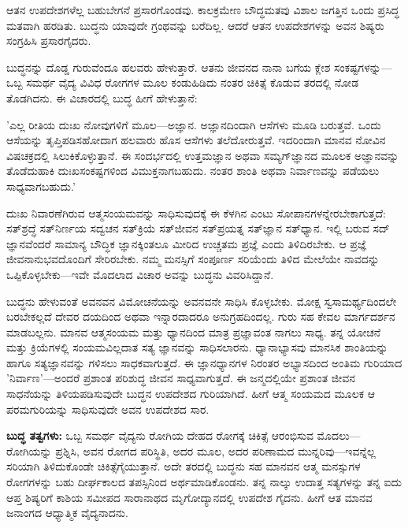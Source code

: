 ಆತನ ಉಪದೇಶಗಳೆಲ್ಲ ಬಹುಬೇಗನೆ ಪ್ರಸಾರಗೊಂಡವು. ಕಾಲಕ್ರಮೇಣ ಬೌದ್ಧಮತವು ವಿಶಾಲ ಜಗತ್ತಿನ ಒಂದು ಪ್ರಸಿದ್ಧ ಮತವಾಗಿ ಹರಡಿತು. ಬುದ್ಧನು ಯಾವುದೇ ಗ್ರಂಥವನ್ನು ಬರೆದಿಲ್ಲ. ಆದರೆ ಆತನ ಉಪದೇಶಗಳನ್ನು ಅವನ ಶಿಷ್ಯರು ಸಂಗ್ರಹಿಸಿ ಪ್ರಸಾರಗೈದರು.

ಬುದ್ಧನನ್ನು ದೊಡ್ಡ ಗುರುವೆಂದೂ ಹಲವರು ಹೇಳುತ್ತಾರೆ. ಆತನು ಜೀವನದ ನಾನಾ ಬಗೆಯ ಕ್ಲೇಶ ಸಂಕಷ್ಟಗಳನ್ನು—ಒಬ್ಬ ಸಮರ್ಥ ವೈದ್ಯ ವಿವಿಧ ರೋಗಗಳ ಮೂಲ ಕಂಡುಹಿಡಿದು ನಂತರ ಚಿಕಿತ್ಸೆ ಕೊಡುವ ತರದಲ್ಲಿ ನೋಡ ತೊಡಗಿದನು. ಈ ವಿಚಾರದಲ್ಲಿ ಬುದ್ಧ ಹೀಗೆ ಹೇಳುತ್ತಾನೆ:

'ಎಲ್ಲ ರೀತಿಯ ದುಃಖ ನೋವುಗಳಿಗೆ ಮೂಲ—ಅಜ್ಞಾನ. ಅಜ್ಞಾನದಿಂದಾಗಿ ಆಸೆಗಳು ಮೂಡಿ ಬರುತ್ತವೆ. ಒಂದು ಆಸೆಯನ್ನು ತೃಪ್ತಿಪಡಿಸಹೋದಾಗ ಹಲವಾರು ಹೊಸ ಆಸೆಗಳು ತಲೆದೋರುತ್ತವೆ. ಇದರಿಂದಾಗಿ ಮಾನವ ನೋವಿನ ವಿಷಚಕ್ರದಲ್ಲಿ ಸಿಲುಕಿಕೊಳ್ಳುತ್ತಾನೆ. ಈ ಸಂದರ್ಭದಲ್ಲಿ ಉತ್ತಮಜ್ಞಾನ ಅಥವಾ ಸಮ್ಯಗ್​ಜ್ಞಾನದ ಮೂಲಕ ಅಜ್ಞಾನವನ್ನು ತೊಡೆದುಹಾಕಿ ದುಃಖಸಂಕಷ್ಟಗಳಿಂದ ವಿಮುಕ್ತನಾಗಬಹುದು. ನಂತರ ಶಾಂತಿ ಅಥವಾ ನಿರ್ವಾಣವನ್ನು ಪಡೆಯಲು ಸಾಧ್ಯವಾಗಬಹುದು.'

ದುಃಖ ನಿವಾರಣೆಗಿರುವ ಆತ್ಮಸಂಯಮವನ್ನು ಸಾಧಿಸುವುದಕ್ಕೆ ಈ ಕೆಳಗಿನ ಎಂಟು ಸೋಪಾನಗಳನ್ನೇರಬೇಕಾಗುತ್ತದೆ:  ಸತ್​ಶ್ರದ್ಧೆ  ಸತ್​ನಿರ್ಣಯ  ಸದ್ವಚನ  ಸತ್​ಕ್ರಿಯೆ  ಸತ್​ಜೀವನ  ಸತ್​ಪ್ರಯತ್ನ  ಸತ್​ಜ್ಞಾನ  ಸತ್​ಧ್ಯಾನ. ಇಲ್ಲಿ ಬರುವ ಸದ್​ಜ್ಞಾನವೆಂದರೆ ಸಾಮಾನ್ಯ ಬೌದ್ಧಿಕ ಜ್ಞಾನಕ್ಕಿಂತಲೂ ಮೀರಿದ ಉಚ್ಚತಮ ಪ್ರಜ್ಞೆ ಎಂದು ತಿಳಿದಿರಬೇಕು. ಆ ಪ್ರಜ್ಞೆ ಜೀವನಾನುಭವದೊಂದಿಗೆ ಸೇರಿರಬೇಕು. ನಮ್ಮ ಮನಸ್ಸಿಗೆ ಸಂಪೂರ್ಣ ಸರಿಯೆಂದು ತಿಳಿದ ಮೇಲೆಯೇ ನಾವದನ್ನು ಒಪ್ಪಿಕೊಳ್ಳಬೇಕು—ಇವೇ ಮೊದಲಾದ ವಿಚಾರ ಅವನ್ನು ಬುದ್ಧನು ವಿವರಿಸಿದ್ದಾನೆ.

ಬುದ್ಧನು ಹೇಳುವಂತೆ ಅವನವನ ವಿಮೋಚನೆಯನ್ನು ಅವನವನೇ ಸಾಧಿಸಿ ಕೊಳ್ಳಬೇಕು. ಮೋಕ್ಷ ಸ್ವಸಾಮರ್ಥ್ಯದಿಂದಲೇ ಬರಬೇಕಲ್ಲದೆ ದೇವರ ದಯದಿಂದ ಅಥವಾ ಇನ್ನಾರದಾದರೂ ಅನುಗ್ರಹದಿಂದಲ್ಲ. ಗುರು ಸಹ ಕೇವಲ ಮಾರ್ಗದರ್ಶನ ಮಾಡಬಲ್ಲನು. ಮಾನವ ಆತ್ಮಸಂಯಮ ಮತ್ತು ಧ್ಯಾನದಿಂದ ಮಾತ್ರ ಪ್ರಜ್ಞಾವಂತ ನಾಗಲು ಸಾಧ್ಯ. ತನ್ನ ಯೋಚನೆ ಮತ್ತು ಕ್ರಿಯೆಗಳಲ್ಲಿ ಸಂಯಮವಿಲ್ಲದಾತ ಸತ್ಯ ಜ್ಞಾನವನ್ನು ಸಾಧಿಸಲಾರನು. ಧ್ಯಾನಾಭ್ಯಾಸವು ಮಾನಸಿಕ ಶಾಂತಿಯನ್ನು ಹಾಗೂ ಸತ್ಯಜ್ಞಾನವನ್ನು ಗಳಿಸಲು ಸಾಧಕವಾಗುತ್ತದೆ. ಈ ಜ್ಞಾನಧ್ಯಾನಗಳ ನಿರಂತರ ಅಭ್ಯಾಸದಿಂದ ಅಂತಿಮ ಗುರಿಯಾದ 'ನಿರ್ವಾಣ'—ಅಂದರೆ ಪ್ರಶಾಂತ ಪರಿಶುದ್ಧ ಜೀವನ ಸಾಧ್ಯವಾಗುತ್ತದೆ. ಈ ಜನ್ಮದಲ್ಲಿಯೇ ಪ್ರಶಾಂತ ಜೀವನ ಸಾಧನೆಯನ್ನು ತಿಳಿಯಪಡಿಸುವುದೇ ಬುದ್ಧನ ಉಪದೇಶದ ಗುರಿಯಾಗಿದೆ. ಹೀಗೆ ಆತ್ಮ ಸಂಯಮದ ಮೂಲಕ ಆ ಪರಮಗುರಿಯನ್ನು ಸಾಧಿಸುವುದೇ ಅವನ ಉಪದೇಶದ ಸಾರ.

\textbf{ಬುದ್ಧ ತತ್ವಗಳು:} ಒಬ್ಬ ಸಮರ್ಥ ವೈದ್ಯನು ರೋಗಿಯ ದೇಹದ ರೋಗಕ್ಕೆ ಚಿಕಿತ್ಸೆ ಆರಂಭಿಸುವ ಮೊದಲು—ರೋಗಿಯನ್ನು ಪ್ರಶ್ನಿಸಿ, ಅವನ ರೋಗದ ಪರಿಸ್ಥಿತಿ, ಅದರ ಮೂಲ, ಅದರ ಪರಿಣಾಮದ ಮುನ್ನರಿವು—ಇವನ್ನೆಲ್ಲ ಸರಿಯಾಗಿ ತಿಳಿದುಕೊಂಡೇ ಚಿಕಿತ್ಸೆಗೈಯುತ್ತಾನೆ. ಅದೇ ತರದಲ್ಲಿ ಬುದ್ಧನು ಸಹ ಮಾನವನ ಆತ್ಮ ಮನಸ್ಸುಗಳ ರೋಗಗಳನ್ನು ಬಹು ದೀರ್ಘಕಾಲದ ತಪಸ್ಸಿನಿಂದ ಅರ್ಥಮಾಡಿಕೊಂಡನು. ತನ್ನ ನಾಲ್ಕು ಉದಾತ್ತ ಸತ್ಯಗಳನ್ನು ತನ್ನ ಐದು ಆಪ್ತ ಶಿಷ್ಯರಿಗೆ ಕಾಶಿಯ ಸಮೀಪದ ಸಾರಾನಾಥದ ಮೃಗೋದ್ಯಾನದಲ್ಲಿ ಉಪದೇಶ ಗೈದನು. ಹೀಗೆ ಆತ ಮಾನವ ಜನಾಂಗದ ಆಧ್ಯಾತ್ಮಿಕ ವೈದ್ಯನಾದನು.

